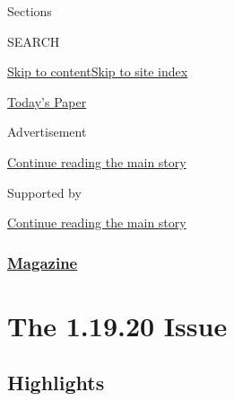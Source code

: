 Sections

SEARCH

\protect\hyperlink{site-content}{Skip to
content}\protect\hyperlink{site-index}{Skip to site index}

\href{https://myaccount.nytimes3xbfgragh.onion/auth/login?response_type=cookie\&client_id=vi}{}

\href{https://www.nytimes3xbfgragh.onion/section/todayspaper}{Today's
Paper}

Advertisement

\protect\hyperlink{after-top}{Continue reading the main story}

Supported by

\protect\hyperlink{after-sponsor}{Continue reading the main story}

\hypertarget{magazine}{%
\subsubsection{\texorpdfstring{\href{/section/magazine}{Magazine}}{Magazine}}\label{magazine}}

\hypertarget{the-11920-issue}{%
\section{The 1.19.20 Issue}\label{the-11920-issue}}

\hypertarget{highlights}{%
\subsection{Highlights}\label{highlights}}


